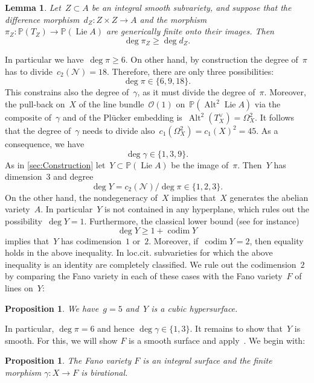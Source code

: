 \documentclass[a4paper]{amsart}
\newcommand{\bbP}{\mathbb{P}}
\newcommand{\cN}{\mathcal{N}}
\newcommand{\cO}{\mathcal{O}}
\DeclareMathOperator{\Lie}{Lie}
\DeclareMathOperator{\codim}{codim}
\DeclareMathOperator{\Alt}{Alt}
\renewcommand{\ge}{\geqslant}
\theoremstyle{plain}
\newtheorem{lemma}[theorem]{Lemma}
\newtheorem{proposition}[theorem]{Proposition}
\theoremstyle{definition}
\numberwithin{equation}{section}
\begin{document}
\begin{lemma} \label{Prop:DegreeOfPiE6} Let~$Z \subset A$ be an integral smooth subvariety, and suppose that the difference morphism~$d_Z \colon Z \times Z \to A$ and the morphism~$\pi_Z \colon \bbP(T_Z) \to \bbP(\Lie A)$ are generically finite onto their images. Then
\[ \deg \pi_Z \ge \deg d_Z.\]
\end{lemma}

In particular we have~$\deg \pi \ge 6$. On other hand, by construction the degree of~$\pi$ has to divide~$c_2(\cN) = 18$. Therefore, there are only three possibilities:
\[ \deg \pi \in \{ 6, 9, 18 \}. \]
This constrains also the degree of~$\gamma$, as it must divide the degree of~$\pi$. Moreover, the pull-back on~$X$  of the line bundle~$\cO(1)$ on~$\bbP(\Alt^2 \Lie A)$ via the composite of~$\gamma$ and of the Pl\"ucker embedding is~$\Alt^2 (T_X^\vee) = \Omega^2_X$. It follows that the degree of~$\gamma$ needs to divide also~$c_1(\Omega^2_X) = c_1(X)^2 = 45$. 
As a consequence, we have
\begin{equation} \label{Eq:DegreeOfGaussMapE6}  \deg \gamma \in \{ 1,3, 9\}. \end{equation}
As in \cref{sec:Construction} let~$Y \subset \bbP(\Lie A)$ be the image of~$\pi$. Then~$Y$ has dimension~$3$ and degree
\[ \deg Y = c_2(\cN) / \deg \pi \in \{1, 2,  3\}.\]
On the other hand, the nondegeneracy of~$X$ implies that~$X$ generates the abelian variety~$A$. In particular~$Y$ is not contained in any hyperplane, which rules out the possibility~$\deg Y = 1$. Furthermore, the classical lower bound (see \cite[prop. 0]{EisenbudHarrisMinimalDegree} for instance)
\[\deg Y \ge 1 + \codim Y\]
implies that~$Y$ has codimension~$1$ or~$2$. Moreover, if~$\codim Y = 2$, then equality holds in the above inequality. In loc.cit. subvarieties for which the above inequality is an identity are completely classified. We rule out the codimension~$2$ by comparing the Fano variety in each of these cases with the Fano variety~$F$ of lines  on~$Y$:

\begin{proposition}\label{Prop:ImageOfPiIsACubicHypersurface} We have~$g = 5$ and~$Y$ is a cubic hypersurface.
\end{proposition}

In particular, $\deg \pi = 6$ and hence $\deg \gamma \in \{1,3\}$. It remains to show that~$Y$ is smooth. For this, we will show $F$ is a smooth surface and apply~\cite[th.~4.2]{AltmanKleiman}. We begin with:

\begin{proposition} \label{Prop:GaussMapIsBirational} The Fano variety $F$ is an integral surface and the finite morphism $\gamma \colon X \to F$ is birational.
\end{proposition}
\end{document}
